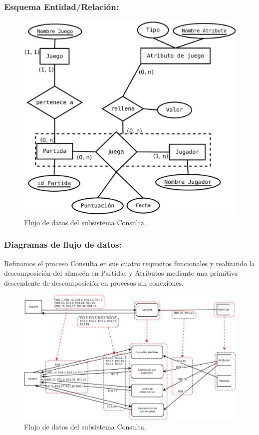 \subsubsection{Esquema Entidad/Relación:}

\begin{figure}[h!]
	\centering
	\includegraphics[width=0.7\linewidth]{../Diagramas/pdf/ER-Consulta.pdf}
	\caption{Flujo de datos del subsistema Consulta.}
	
	\label{fig:ERConsulta}
\end{figure}

\subsubsection{Diagramas de flujo de datos:}

Refinamos el proceso Consulta en sus cuatro requisitos funcionales  y realizando la descomposición del almacén en Partidas y Atributos mediante una primitiva descendente de descomposición en procesos sin conexiones.
 
\begin{figure}[h!]
\centering
\includegraphics[width=0.7\linewidth]{../Diagramas/pdf/RefinamientoConsulta.pdf}
\caption{Flujo de datos del subsistema Consulta.}

\label{fig:RefinamientoConsulta}
\end{figure}

